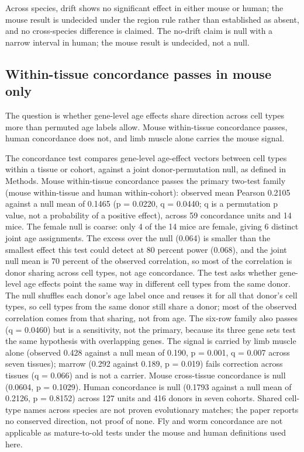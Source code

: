 \documentclass[11pt]{article}
\begin{document}
Across species, drift shows no significant effect in either mouse or human; the mouse result is undecided under the region rule rather than established as absent, and no cross-species difference is claimed. The no-drift claim is null with a narrow interval in human; the mouse result is undecided, not a null.

\subsection*{Within-tissue concordance passes in mouse only}

The question is whether gene-level age effects share direction across cell types more than permuted age labels allow. Mouse within-tissue concordance passes, human concordance does not, and limb muscle alone carries the mouse signal.

The concordance test compares gene-level age-effect vectors between cell types within a tissue or cohort, against a joint donor-permutation null, as defined in Methods. Mouse within-tissue concordance passes the primary two-test family (mouse within-tissue and human within-cohort): observed mean Pearson 0.2105 against a null mean of 0.1465 (p = 0.0220, q = 0.0440; q is a permutation p value, not a probability of a positive effect), across 59 concordance units and 14 mice. The female null is coarse: only 4 of the 14 mice are female, giving 6 distinct joint age assignments. The excess over the null (0.064) is smaller than the smallest effect this test could detect at 80 percent power (0.068), and the joint null mean is 70 percent of the observed correlation, so most of the correlation is donor sharing across cell types, not age concordance. The test asks whether gene-level age effects point the same way in different cell types from the same donor. The null shuffles each donor's age label once and reuses it for all that donor's cell types, so cell types from the same donor still share a donor; most of the observed correlation comes from that sharing, not from age. The six-row family also passes (q = 0.0460) but is a sensitivity, not the primary, because its three gene sets test the same hypothesis with overlapping genes. The signal is carried by limb muscle alone (observed 0.428 against a null mean of 0.190, p = 0.001, q = 0.007 across seven tissues); marrow (0.292 against 0.189, p = 0.019) fails correction across tissues (q = 0.066) and is not a carrier. Mouse cross-tissue concordance is null (0.0604, p = 0.1029). Human concordance is null (0.1793 against a null mean of 0.2126, p = 0.8152) across 127 units and 416 donors in seven cohorts. Shared cell-type names across species are not proven evolutionary matches; the paper reports no conserved direction, not proof of none. Fly and worm concordance are not applicable as mature-to-old tests under the mouse and human definitions used here.
\end{document}
